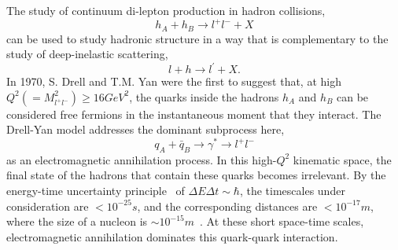 The study of continuum di-lepton production in hadron collisions,
\begin{equation}
h_A +  h_B \rightarrow l^+ l^- + X
\label{eq:hh2ll}
\end{equation} 
can be used to study hadronic structure in a way that is complementary to the study of deep-inelastic scattering,
\begin{equation}
l + h \rightarrow l^\prime + X.
\label{eq:lh2lx}
\end{equation}
In 1970, S. Drell and T.M. Yan were the first to suggest that, at high $Q^2 (=M^2_{l^+ l^-}) \geq 16GeV^2$, the quarks inside the hadrons $h_A$ and $h_B$ can be considered free fermions in the instantaneous moment that they interact. The Drell-Yan model addresses the dominant subprocess here,
\begin{equation}
q_A + \bar{q}_B \rightarrow \gamma^* \rightarrow l^+ l^-
\label{eq:dy-process}
\end{equation} 
as an electromagnetic annihilation process. In this high-$Q^2$ kinematic space, the final state of the hadrons that contain these quarks becomes irrelevant. By the energy-time uncertainty principle~\cite{aHeisenberg:1927zz} of $\Delta E \Delta t \sim \hbar$, the timescales under consideration are $<10^{-25}s$, and the corresponding distances are $<10^{-17}m$, where the size of a nucleon is $\sim 10^{-15}m$~\cite{povh2002particles}. At these short space-time scales, electromagnetic annihilation dominates this quark-quark interaction.

